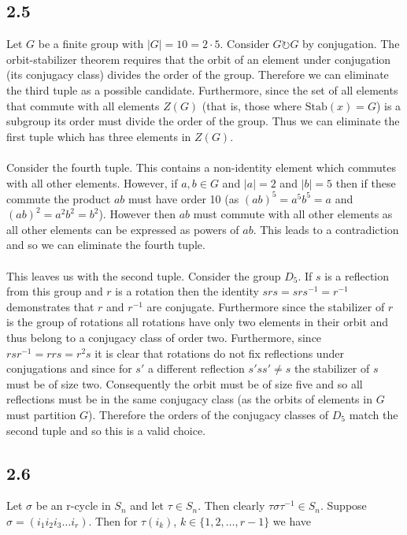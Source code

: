 \documentclass{article}
\begin{document}
\subsection*{2.5}
Let $G$ be a finite group with $|G| = 10 = 2\cdot5$. Consider $G \circlearrowright G$ by conjugation. 
The orbit-stabilizer theorem requires that the orbit of an element under conjugation (its conjugacy 
class) divides the order of the group. Therefore we can eliminate the third tuple as a possible candidate. Furthermore, since the 
set of all elements that commute with all elements $Z(G)$ (that is, those where $\text{Stab}(x) = G$) is a subgroup its order must divide the 
order of the group. Thus we can eliminate the first tuple which has three elements in $Z(G)$.

\paragraph{}
Consider the fourth tuple. This contains a non-identity element which commutes with all other 
elements. However, if $a,b \in G$ and $|a| = 2$ and $|b| =5$ then if these commute the product 
$ab$ must have order 10 (as $(ab)^5 = a^5b^5 = a$ and $(ab)^2 = a^2b^2 = b^2$). However then 
$ab$ must commute with all other elements as all other elements can be expressed as powers of $ab$. 
This leads to a contradiction and so we can eliminate the fourth tuple.

\paragraph{}
This leaves us with the second tuple. Consider the group $D_5$. If $s$ is a reflection from this 
group and $r$ is a rotation then the identity $srs = srs^{-1} = r^{-1}$ demonstrates that $r$ and 
$r^{-1}$ are conjugate. Furthermore since the stabilizer of $r$ is the group of rotations all rotations 
have only two elements in their orbit and thus belong to a conjugacy class of order two. Furthermore, 
since $rsr^{-1} = rrs = r^2s$ it is clear that rotations do not fix reflections under conjugations 
and since for $s'$ a different reflection $s'ss' \neq s$ the stabilizer of $s$ must be of size 
two. Consequently the orbit must be of size five and so all reflections must be in the same 
conjugacy class (as the orbits of elements in $G$ must partition $G$). Therefore the orders of 
the conjugacy classes of $D_5$ match the second tuple and so this is a valid choice.

\subsection*{2.6}
Let $\sigma$ be an r-cycle in $S_n$ and let $\tau \in S_n$. Then clearly $\tau\sigma\tau^{-1} \in S_n$. 
Suppose $\sigma = (i_1i_2i_3\dots i_r)$. Then for $\tau(i_k)$, $k \in \{1,2,\dots,r-1\}$ we have 
\end{document}
